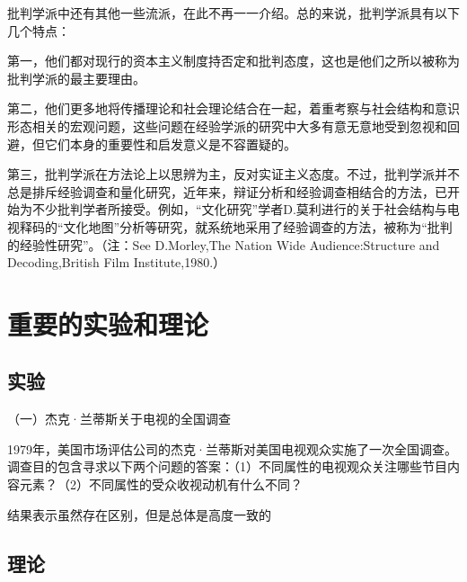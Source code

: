 \documentclass[UTF8,12pt]{ctexart}
\numberwithin{equation}{section} %
\numberwithin{figure}{section}
\numberwithin{table}{section}
\begin{document}
	批判学派中还有其他一些流派，在此不再一一介绍。总的来说，批判学派具有以下几个特点：
	
	第一，他们都对现行的资本主义制度持否定和批判态度，这也是他们之所以被称为批判学派的最主要理由。
	
	第二，他们更多地将传播理论和社会理论结合在一起，着重考察与社会结构和意识形态相关的宏观问题，这些问题在经验学派的研究中大多有意无意地受到忽视和回避，但它们本身的重要性和启发意义是不容置疑的。
	
	第三，批判学派在方法论上以思辨为主，反对实证主义态度。不过，批判学派并不总是排斥经验调查和量化研究，近年来，辩证分析和经验调查相结合的方法，已开始为不少批判学者所接受。例如，“文化研究”学者D.莫利进行的关于社会结构与电视释码的“文化地图”分析等研究，就系统地采用了经验调查的方法，被称为“批判的经验性研究”。（注：See D.Morley,The Nation Wide Audience:Structure and Decoding,British Film Institute,1980.）

	\section{重要的实验和理论}
	
	\subsection{实验}
	（一）杰克·兰蒂斯关于电视的全国调查
	
	1979年，美国市场评估公司的杰克·兰蒂斯对美国电视观众实施了一次全国调查。调查目的包含寻求以下两个问题的答案：（1）不同属性的电视观众关注哪些节目内容元素？（2）不同属性的受众收视动机有什么不同？
	
	结果表示虽然存在区别，但是总体是高度一致的
	
	
	\subsection{理论}
\end{document}
